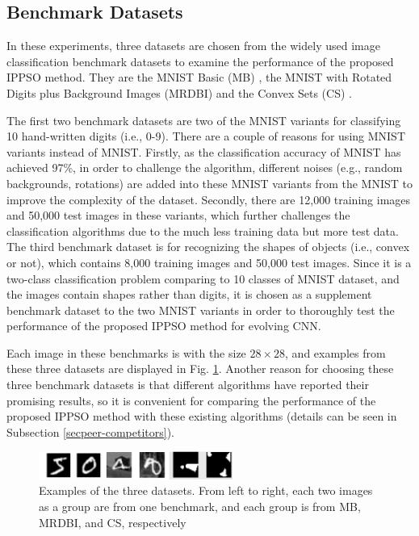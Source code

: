 \documentclass[conference]{IEEEtran}
\begin{document}
\subsection{Benchmark Datasets}\label{sec:EPDatasets}

In these experiments, three datasets are chosen from the widely used image classification benchmark datasets to examine the performance of the proposed IPPSO method. They are the MNIST Basic (MB) \cite{DeepArchitectureEval:Larochelle}, the MNIST with Rotated Digits plus Background Images (MRDBI) \cite{DeepArchitectureEval:Larochelle} and the Convex Sets (CS) \cite{DeepArchitectureEval:Larochelle}. 

The first two benchmark datasets are two of the MNIST \cite{DocumentRecognition:LeCun} variants for classifying 10 hand-written digits (i.e., 0-9). There are a couple of reasons for using MNIST variants instead of MNIST. Firstly, as the classification accuracy of MNIST has achieved 97\%, in order to challenge the algorithm, different noises (e.g., random backgrounds, rotations) are added into these MNIST variants from the MNIST to improve the complexity of the dataset. Secondly, there are 12,000 training images and 50,000 test images in these variants, which further challenges the classification algorithms due to the much less training data but more test data. The third benchmark dataset is for recognizing the shapes of objects (i.e., convex or not), which contains 8,000 training images and 50,000 test images. Since it is a two-class classification problem comparing to 10 classes of MNIST dataset, and the images contain shapes rather than digits, it is chosen as a supplement benchmark dataset to the two MNIST variants in order to thoroughly test the performance of the proposed IPPSO method for evolving CNN. 

Each image in these benchmarks is with the size $28 \times 28$, and examples from these three datasets are displayed in Fig. \ref{fig:images}. Another reason for choosing these three benchmark datasets is that different algorithms have reported their promising results, so it is convenient for comparing the performance of the proposed IPPSO method with these existing algorithms (details can be seen in Subsection \ref{secpeer-competitors}).

\begin{figure}[!t]
	\centering
	\includegraphics[width=2.5in]{ippso_image_samples}
	\caption{Examples of the three datasets. From left to right, each two images as a group are from one benchmark, and each group is from MB, MRDBI, and CS, respectively}
	\label{fig:images}
\end{figure}
\end{document}
